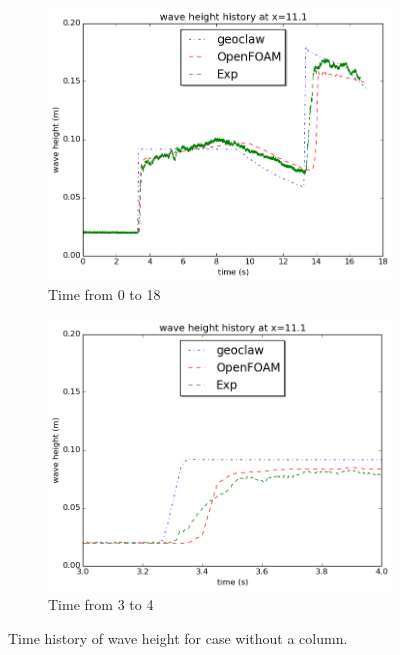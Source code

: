 \documentclass[11pt]{article}
\begin{document}
\begin{figure}[h!]
    \centering
    \begin{subfigure}[b]{0.4\textwidth}
        \includegraphics[width=1\textwidth]{./plots/waveheight_nocolumn}
        \caption{Time from 0 to 18}
        \label{fig:waveheight_nocolumn}
    \end{subfigure}
    \begin{subfigure}[b]{0.4\textwidth}
        \includegraphics[width=1\textwidth]{./plots/waveheight_nocolumn_zoomin}
        \caption{Time from 3 to 4}
        \label{fig:waveheight_nocolumn_zoomin}
    \end{subfigure}
    \caption{Time history of wave height for case without a column. }
\end{figure}
\end{document}
